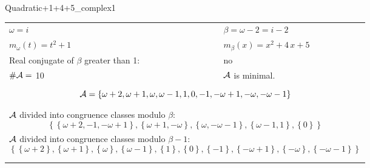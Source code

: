 \begin{exmp}
\label{ex:compareAP}

Quadratic+1+4+5\_complex1

\rule{0cm}{0cm}

\begin{tabular}{ll}
$\omega=  i $  & $\beta= \omega - 2 = i - 2 $\\
$m_\omega(t)=  t^{2} + 1 $  & $m_\beta(x)=  x^{2} + 4 \, x + 5 $\\
Real conjugate of $\beta$ greater than 1:   &  no \\
$\#\mathcal{A}= $ 10 $ $ & $\mathcal{A}$ is minimal. \\
\multicolumn{2}{l}{\begin{minipage}{\textwidth}\begin{dmath*}\A = \left\{\omega + 2, \omega + 1, \omega, \omega - 1, 1, 0, -1, -\omega + 1, -\omega, -\omega - 1\right\}  \end{dmath*}\end{minipage} }\\
\multicolumn{2}{l}{\begin{minipage}{\textwidth}$\mathcal{A}$ divided into congruence classes modulo $\beta$: \begin{dmath*} \left\{\left\{\omega + 2, -1, -\omega + 1\right\}, \left\{\omega + 1, -\omega\right\}, \left\{\omega, -\omega - 1\right\}, \left\{\omega - 1, 1\right\}, \left\{0\right\}\right\}  \end{dmath*}\end{minipage} }\\[10pt]
\multicolumn{2}{l}{\begin{minipage}{\textwidth}$\mathcal{A}$ divided into congruence classes modulo $\beta-1$: \begin{dmath*} \left\{\left\{\omega + 2\right\}, \left\{\omega + 1\right\}, \left\{\omega\right\}, \left\{\omega - 1\right\}, \left\{1\right\}, \left\{0\right\}, \left\{-1\right\}, \left\{-\omega + 1\right\}, \left\{-\omega\right\}, \left\{-\omega - 1\right\}\right\}  \end{dmath*}\end{minipage} }\\
 & \\ \hline
 & \\
\end{tabular}


\end{exmp}
